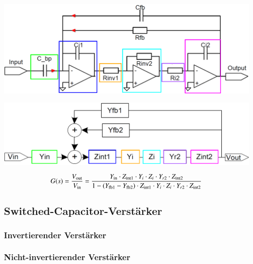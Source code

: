 \begin{minipage}[c]{0.48\columnwidth}
    \includegraphics[width=\columnwidth]{images/signalflussdiagramme_bandpass_schaltung.png}
\end{minipage}
\hfill
\begin{minipage}[c]{0.48\columnwidth}
    \includegraphics[width=\columnwidth]{images/signalflussdiagramme_bandpass_blockschaltbild.png}
\end{minipage}

$$ G(s) = \frac{V_{\rm out}}{V_{\rm in}} = \frac{Y_{\rm in} \cdot Z_{\rm int1} \cdot Y_i \cdot Z_i \cdot Y_{r2} \cdot Z_{\rm int2} }
    {1 - (Y_{\rm fb1} - Y_{\rm fb2}) \cdot Z_{\rm int1} \cdot Y_i \cdot Z_i \cdot Y_{r2} \cdot Z_{\rm int2} } $$




\subsection{Switched-Capacitor-Verstärker}

\subsubsection{Invertierender Verstärker}


\subsubsection{Nicht-invertierender Verstärker}


